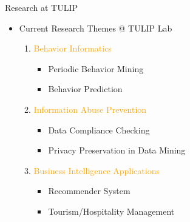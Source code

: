 \documentclass[
 size=14pt,
 paper=smartboard,  %
 mode=present, 		%
 display=slides, 	%
 style=tuliplab,  	%
 pauseslide,
 fleqn,leqno]{powerdot}
\begin{document}
\begin{slide}[toc=,bm=]{Research at TULIP}
\begin{itemize}
    \item<1->
    Current Research Themes @ TULIP Lab
    \begin{enumerate}
        \item<2->
        \textcolor{orange}{Behavior Informatics}
            \begin{itemize}
                \item<2->
                Periodic Behavior Mining

                \item<2->
                Behavior Prediction
            \end{itemize}

        \item<3->
        \textcolor{orange}{Information Abuse Prevention}
            \begin{itemize}
                \item<3->
                Data Compliance Checking

                \item<3->
                Privacy Preservation in Data Mining
            \end{itemize}
        \item<4->
        \textcolor{orange}{Business Intelligence Applications}
            \begin{itemize}
                \item<4->
                Recommender System

                \item<4->
                Tourism/Hospitality Management
            \end{itemize}
    \end{enumerate}
\end{itemize}
\end{slide}
\end{document}
